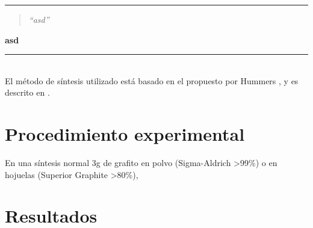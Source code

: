 \noindent
\rule{\linewidth}{1 pt}
\begin{flushright}
	\begin{quotation}
		\small{
			\textit{``asd''}}
	\end{quotation}
	\bf{asd}
\end{flushright}
\noindent
\rule{\linewidth}{1 pt}\\
\vfill
El método de síntesis utilizado está basado en el propuesto por Hummers \citep{Hummers1958}, y es descrito en \citep{Abdolhosseinzadeh2015}.
\section{Procedimiento experimental}
En una síntesis normal 3g de grafito en polvo (Sigma-Aldrich >99\%) o en hojuelas (Superior Graphite >80\%), 

\section{Resultados}